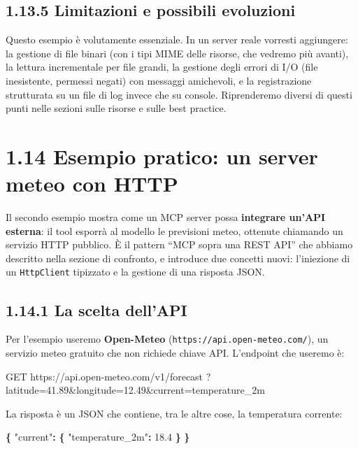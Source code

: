 \documentclass[
  italian,
  10pt,
]{book}
\newenvironment{Shaded}{\begin{snugshade}}{\end{snugshade}}
\newcommand{\DataTypeTok}[1]{\textcolor[rgb]{0.13,0.29,0.53}{#1}}
\newcommand{\FloatTok}[1]{\textcolor[rgb]{0.00,0.00,0.81}{#1}}
\newcommand{\FunctionTok}[1]{\textcolor[rgb]{0.13,0.29,0.53}{\textbf{#1}}}
\newcommand{\NormalTok}[1]{#1}
\begin{document}
\subsection{1.13.5 Limitazioni e possibili
evoluzioni}\label{limitazioni-e-possibili-evoluzioni}

Questo esempio è volutamente essenziale. In un server reale vorresti
aggiungere: la gestione di file binari (con i tipi MIME delle risorse,
che vedremo più avanti), la lettura incrementale per file grandi, la
gestione degli errori di I/O (file inesistente, permessi negati) con
messaggi amichevoli, e la registrazione strutturata su un file di log
invece che su console. Riprenderemo diversi di questi punti nelle
sezioni sulle risorse e sulle best practice.

\section{1.14 Esempio pratico: un server meteo con
HTTP}\label{esempio-pratico-un-server-meteo-con-http}

Il secondo esempio mostra come un MCP server possa \textbf{integrare
un'API esterna}: il tool esporrà al modello le previsioni meteo,
ottenute chiamando un servizio HTTP pubblico. È il pattern ``MCP sopra
una REST API'' che abbiamo descritto nella sezione di confronto, e
introduce due concetti nuovi: l'iniezione di un \texttt{HttpClient}
tipizzato e la gestione di una risposta JSON.

\subsection{1.14.1 La scelta dell'API}\label{la-scelta-dellapi}

Per l'esempio useremo \textbf{Open-Meteo}
(\texttt{https://api.open-meteo.com/}), un servizio meteo gratuito che
non richiede chiave API. L'endpoint che useremo è:

\begin{Shaded}
\begin{Highlighting}[]
\NormalTok{GET https://api.open{-}meteo.com/v1/forecast}
\NormalTok{    ?latitude=41.89\&longitude=12.49\&current=temperature\_2m}
\end{Highlighting}
\end{Shaded}

La risposta è un JSON che contiene, tra le altre cose, la temperatura
corrente:

\begin{Shaded}
\begin{Highlighting}[]
\FunctionTok{\{}
  \DataTypeTok{"current"}\FunctionTok{:} \FunctionTok{\{}
    \DataTypeTok{"temperature\_2m"}\FunctionTok{:} \FloatTok{18.4}
  \FunctionTok{\}}
\FunctionTok{\}}
\end{Highlighting}
\end{Shaded}
\end{document}
